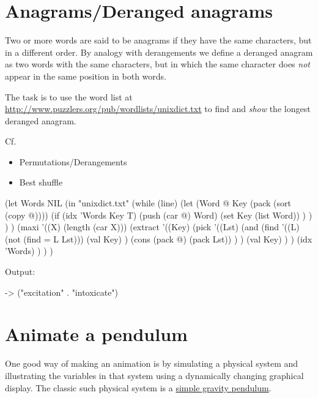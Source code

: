 \pagebreak{}
\section*{Anagrams/Deranged anagrams}

Two or more words are said to be anagrams if they have the same
characters, but in a different order. By analogy with derangements we
define a deranged anagram as two words with the same characters, but
in which the same character does \emph{not} appear in the same
position in both words.

The task is to use the word list at
\href{http://www.puzzlers.org/pub/wordlists/unixdict.txt}{http://www.puzzlers.org/pub/wordlists/unixdict.txt}
to find and \emph{show} the longest deranged anagram.

Cf.

\begin{itemize}
\item
  Permutations/Derangements
\item
  Best shuffle
\end{itemize}


\begin{wideverbatim}

(let Words NIL
   (in "unixdict.txt"
      (while (line)
         (let (Word @  Key (pack (sort (copy @))))
            (if (idx 'Words Key T)
               (push (car @) Word)
               (set Key (list Word)) ) ) ) )
   (maxi '((X) (length (car X)))
      (extract
         '((Key)
            (pick
               '((Lst)
                  (and
                     (find
                        '((L) (not (find = L Lst)))
                        (val Key) )
                     (cons (pack @) (pack Lst)) ) )
               (val Key) ) )
         (idx 'Words) ) ) )

Output:

-> ("excitation" . "intoxicate")

\end{wideverbatim}

\pagebreak{}
\section*{Animate a pendulum}


One good way of making an animation is by simulating a physical system
and illustrating the variables in that system using a dynamically
changing graphical display. The classic such physical system is a
\href{http://en.wikipedia.org/wiki/Pendulum}{simple gravity pendulum}.

